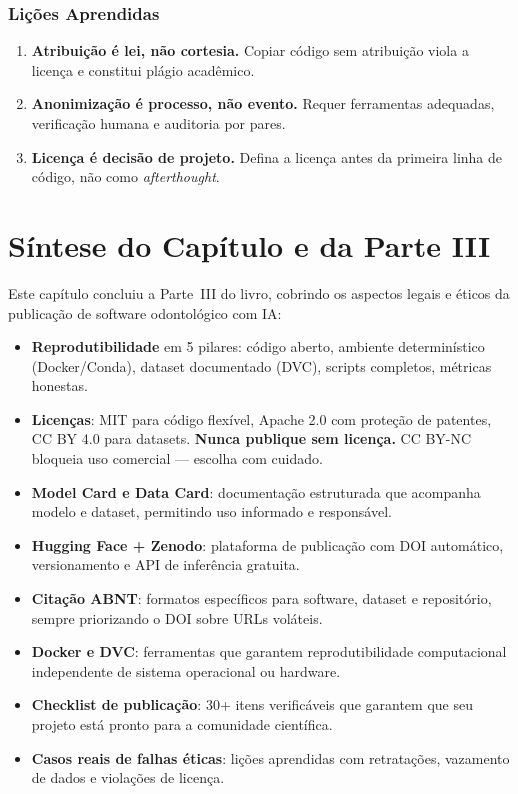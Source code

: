 \subsubsection{Lições Aprendidas}

\begin{enumerate}
  \item \textbf{Atribuição é lei, não cortesia.} Copiar código sem
    atribuição viola a licença e constitui plágio acadêmico.

  \item \textbf{Anonimização é processo, não evento.} Requer ferramentas
    adequadas, verificação humana e auditoria por pares.

  \item \textbf{Licença é decisão de projeto.} Defina a licença antes da
    primeira linha de código, não como \textit{afterthought}.
\end{enumerate}

\section{Síntese do Capítulo e da Parte III}

Este capítulo concluiu a Parte~III do livro, cobrindo os aspectos legais
e éticos da publicação de software odontológico com IA:

\begin{itemize}
  \item \textbf{Reprodutibilidade} em 5 pilares: código aberto, ambiente
    determinístico (Docker/Conda), dataset documentado (DVC), scripts
    completos, métricas honestas.

  \item \textbf{Licenças}: MIT para código flexível, Apache 2.0 com
    proteção de patentes, CC BY 4.0 para datasets. \textbf{Nunca publique
    sem licença.} CC BY-NC bloqueia uso comercial — escolha com cuidado.

  \item \textbf{Model Card e Data Card}: documentação estruturada que
    acompanha modelo e dataset, permitindo uso informado e responsável.

  \item \textbf{Hugging Face + Zenodo}: plataforma de publicação com
    DOI automático, versionamento e API de inferência gratuita.

  \item \textbf{Citação ABNT}: formatos específicos para software,
    dataset e repositório, sempre priorizando o DOI sobre URLs voláteis.

  \item \textbf{Docker e DVC}: ferramentas que garantem reprodutibilidade
    computacional independente de sistema operacional ou hardware.

  \item \textbf{Checklist de publicação}: 30+ itens verificáveis que
    garantem que seu projeto está pronto para a comunidade científica.

  \item \textbf{Casos reais de falhas éticas}: lições aprendidas com
    retratações, vazamento de dados e violações de licença.
\end{itemize}

